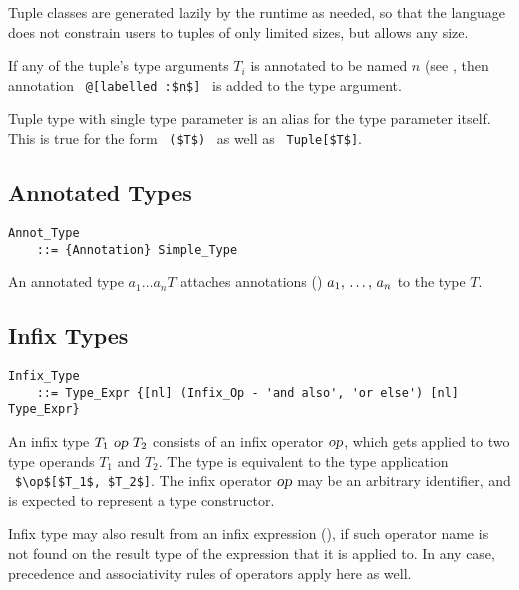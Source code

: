 Tuple classes are generated lazily by the runtime as needed, so that the language does not constrain users to tuples of only limited sizes, but allows any size. 

If any of the tuple's type arguments $T_i$ is annotated to be named $n$ (see , then annotation ~\lstinline!@[labelled :$n$]!~ is added to the type argument. 

Tuple type with single type parameter is an alias for the type parameter itself. This is true for the form ~\lstinline!($T$)!~ as well as ~\lstinline!Tuple[$T$]!.






\subsection{Annotated Types}

\grammar\begin{lstlisting}
Annot_Type 
    ::= {Annotation} Simple_Type
\end{lstlisting}

An annotated type $a_1 \ldots a_n T$ attaches annotations () $a_1 ,\, \ldots ,\, a_n$ to the type $T$. 





\subsection{Infix Types}
\label{sec:infix-types}

\grammar\begin{lstlisting}
Infix_Type 
    ::= Type_Expr {[nl] (Infix_Op - 'and also', 'or else') [nl] Type_Expr}
\end{lstlisting}

An infix type $T_1\ \mbox{\sl op}\ T_2$ consists of an infix operator $\mbox{\sl op}$, which gets applied to two type operands $T_1$ and $T_2$. The type is equivalent to the type application ~\lstinline!$\op$[$T_1$, $T_2$]!. The infix operator $\mbox{\sl op}$ may be an arbitrary identifier, and is expected to represent a type constructor. 

Infix type may also result from an infix expression (), if such operator name is not found on the result type of the expression that it is applied to. In any case, precedence and associativity rules of operators apply here as well. 





